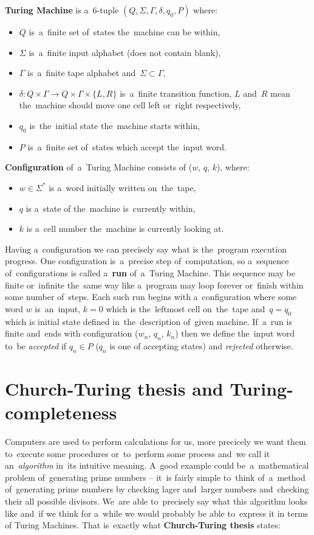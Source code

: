 \documentclass[english,shortabstract,mgr]{iithesis}
\begin{document}
\textbf{Turing Machine} is a~$6$-tuple $(Q,\Sigma,\Gamma,\delta,q_0,P)$ where:
\begin{itemize}
  \item $Q$ is~a~finite set of~states the~machine can be within,
  \item $\Sigma$ is~a~finite input alphabet (does not contain blank),
  \item $\Gamma$ is~a~finite tape alphabet and~$\Sigma \subset \Gamma$,
  \item $\delta: Q \times \Gamma \rightarrow Q \times \Gamma \times \{L,R\}$ is~a~finite
      transition function, $L$ and~$R$ mean the~machine should move one cell left or~right
      respectively,
  \item $q_0$ is~the~initial state the~machine starts within,
  \item $P$ is~a~finite set of~states which accept the~input word.
\end{itemize}

\textbf{Configuration} of~a~Turing Machine consists of ($w$, $q$, $k$), where:
\begin{itemize}
  \item $w \in \Sigma^*$ is a~word initially written on~the~tape,
  \item $q$ is a~state of the~machine is~currently within,
  \item $k$ is a~cell number the~machine is currently looking at.
\end{itemize}

Having a~configuration we can precisely say what is the~program execution progress.
One configuration is~a~precise step of~computation, so a~sequence of~configurations is called
a~\textbf{run} of~a~Turing Machine. This sequence may be finite or~infinite the~same way like
a~program may loop forever or~finish within some number of~steps. Each such run begins with
a~configuration where some word $w$ is~an~input, $k = 0$ which is the~leftmost cell on~the~tape
and~$q = q_0$ which is initial state defined in~the~description of~given machine. If~a~run is
finite and~ends with configuration ($w_n$, $q_n$, $k_n$) then we define the~input word to~be
\textit{accepted} if $q_n \in P$ ($q_n$ is one of accepting states) and \textit{rejected} otherwise.

\section{Church-Turing thesis and Turing-completeness}

Computers are used to perform calculations for us, more precicely we want them to~execute some
procedures or~to~perform some process and~we call it an~\textit{algorithm} in~its intuitive meaning.
A~good example could be~a~mathematical problem of~generating prime numbers -- it~is fairly simple
to~think of~a~method of~generating prime numbers by checking lager and~larger numbers and~checking
their all possible divisors. We~are able to~precisely say what this algorithm looks like and~if
we think for a~while we would probably be able to~express it in terms of Turing Machines. That
is~exactly what \textbf{Church-Turing thesis} states:
\end{document}
